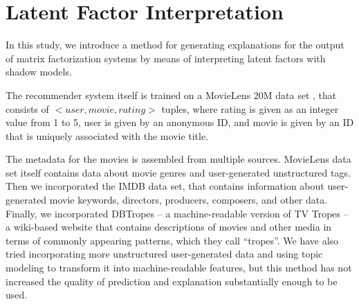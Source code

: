 \chapter{Latent Factor Interpretation}

In this study, we introduce a method for generating explanations for the
output of matrix factorization systems by means of interpreting latent factors
with shadow models.

The recommender system itself is trained on a MovieLens 20M data set
\cite{data-movielens}, that consists of $<user,movie,rating>$ tuples, where
rating is given as an integer value from 1 to 5, user is given by an anonymous
ID, and movie is given by an ID that is uniquely associated with the movie
title.

The metadata for the movies is assembled from multiple sources. MovieLens data
set itself contains data about movie genres and user-generated unstructured
tags. Then we incorporated the IMDB data set\cite{data-imdb}, that contains
information about user-generated movie keywords, directors, producers,
composers, and other data. Finally, we incorporated DBTropes\cite{data-dbtropes}
-- a machine-readable version of TV Tropes -- a wiki-based website that contains
descriptions of movies and other media in terms of commonly appearing patterns,
which they call ``tropes''. We have also tried incorporating more unstructured
user-generated data and using topic modeling to transform it into
machine-readable features, but this method has not increased the quality of
prediction and explanation substantially enough to be used.


